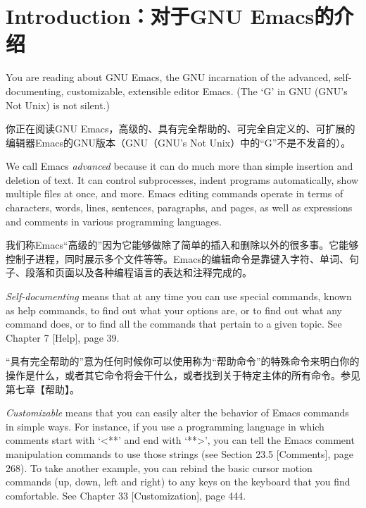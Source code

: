 \chapter{Introduction：对于GNU Emacs的介绍}
You are reading about GNU Emacs, the GNU incarnation of the advanced, self-documenting, customizable, extensible editor Emacs. (The ‘G’ in GNU (GNU’s Not Unix) is not silent.)\par
你正在阅读GNU Emacs，高级的、具有完全帮助的、可完全自定义的、可扩展的编辑器Emacs的GNU版本（GNU（GNU's Not Unix）中的“G”不是不发音的）。\par
We call Emacs \textit{advanced} because it can do much more than simple insertion and deletion of text. It can control subprocesses, indent programs automatically, show multiple files at once, and more. Emacs editing commands operate in terms of characters, words, lines, sentences, paragraphs, and pages, as well as expressions and comments in various programming languages.\par
我们称Emacs“高级的”因为它能够做除了简单的插入和删除以外的很多事。它能够控制子进程，同时展示多个文件等等。Emacs的编辑命令是靠键入字符、单词、句子、段落和页面以及各种编程语言的表达和注释完成的。\par
\textit{Self-documenting} means that at any time you can use special commands, known as help commands, to find out what your options are, or to find out what any command does, or to find all the commands that pertain to a given topic. See Chapter 7 [Help], page 39.\par
“具有完全帮助的”意为任何时候你可以使用称为“帮助命令”的特殊命令来明白你的操作是什么，或者其它命令将会干什么，或者找到关于特定主体的所有命令。参见第七章【帮助】。\par
\textit{Customizable} means that you can easily alter the behavior of Emacs commands in simple ways. For instance, if you use a programming language in which comments start with ‘<**’ and end with ‘**>’, you can tell the Emacs comment manipulation commands to use those strings (see Section 23.5 [Comments], page 268). To take another example, you can rebind the basic cursor motion commands (up, down, left and right) to any keys on the keyboard that you find comfortable. See Chapter 33 [Customization], page 444.\par
